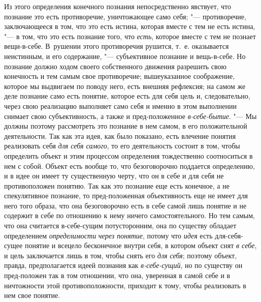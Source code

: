 Из этого определения конечного познания непосредственно
явствует, что познание это есть противоречие, уничтожающее само себя;
"--- противоречие, заключающееся в том, что это есть истина,
которая вместе с тем не есть истина, "--- в том, что это есть
познание того, что {\em есть},
которое вместе с тем не познает вещи-в-себе. В~рушении этого
противоречия рушится, т.~е. оказывается неистинным, и его содержание, "---
субъективное познание и вещь-в-себе. Но познание должно ходом
своего собственного движения разрешить свою конечность и тем самым свое
противоречие; вышеуказанное соображение, которое мы выдвигаем по поводу
него, есть внешняя рефлексия; на самом же деле познание само есть понятие,
которое есть для себя цель и, следовательно, через свою реализацию
выполняет само себя и именно в этом выполнении снимает свою субъективность,
а также и пред-положенное
{\em в-себе-бытие}.
"--- Мы должны поэтому рассмотреть это познание в нем самом, в
его положительной деятельности. Так как эта идея, как было показано, есть
влечение понятия реализовать себя
{\em для себя самого}, то
его деятельность состоит в том, чтобы определить объект и этим процессом
определения тождественно соотноситься в нем с собой. Объект есть вообще то,
что безоговорочно поддается определению, и в идее он имеет ту существенную
черту, что он в себе и для себя не противоположен понятию. Так как это
познание еще есть конечное, а не спекулятивное познание, то пред-положенная
объективность еще не имеет для него того образа, что она безоговорочно есть
в себе самой лишь понятие и не содержит в себе по отношению к нему ничего
самостоятельного. Но тем самым, что она считается в-себе-сущим
потусторонним, она по существу обладает определением
{\em определимости}
{\em через понятие},
потому что {\em идея}
есть для-себя-сущее понятие и всецело бесконечное внутри
себя, в котором объект снят {\em в
себе}, и цель заключается лишь в том, чтобы снять его
{\em для себя}; поэтому
объект, правда, предполагается идеей познания как
{\em в-себе-сущий}, но по
существу он пред-положен так в том отношении, что она,
уверенная в самой себе и в ничтожности этой
противоположности, приходит к тому, чтобы реализовать в нем свое понятие.

